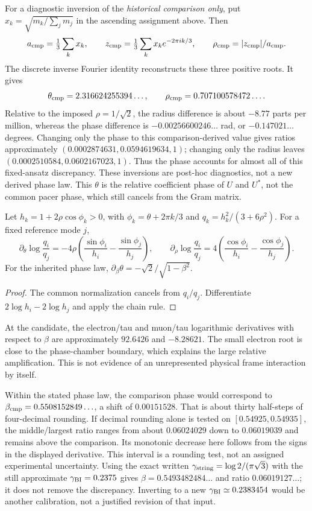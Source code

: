 For a diagnostic inversion of the \emph{historical comparison only},
put $x_k=\sqrt{m_k/\sum_jm_j}$ in the ascending assignment above.
Then
\[
 a_{\rm cmp}=\tfrac13\sum_kx_k,\qquad
 z_{\rm cmp}=\tfrac13\sum_kx_k e^{-2\pi i k/3},\qquad
 \rho_{\rm cmp}=|z_{\rm cmp}|/a_{\rm cmp}.
\]
The discrete inverse Fourier identity reconstructs these three positive
roots. It gives
\[
 \theta_{\rm cmp}=2.316624255394\ldots,\qquad
 \rho_{\rm cmp}=0.707100578472\ldots.
\]
Relative to the imposed $\rho=1/\sqrt2$, the radius difference is
about $-8.77$ parts per million, whereas the phase difference is
$-0.00256600246\ldots$ rad, or $-0.147021\ldots$ degrees.
Changing only the phase to this comparison-derived value gives
ratios approximately $(0.0002874631,0.0594619634,1)$; changing
only the radius leaves $(0.0002510584,0.0602167023,1)$.
Thus the phase accounts for almost all of this fixed-ansatz discrepancy.
These inversions are post-hoc diagnostics, not a new derived phase law.
This $\theta$ is the relative coefficient phase of $U$ and $U^*$,
not the common pacer phase, which still cancels from the Gram matrix.

\begin{proposition}
\label{v480:matrix-phase-sensitivity}
Let $h_k=1+2\rho\cos\phi_k>0$, with
$\phi_k=\theta+2\pi k/3$ and
$q_k=h_k^2/(3+6\rho^2)$. For a fixed reference mode $j$,
\[
 \partial_\theta\log\frac{q_i}{q_j}
 =-4\rho\left(\frac{\sin\phi_i}{h_i}
                    -\frac{\sin\phi_j}{h_j}\right),
 \qquad
 \partial_\rho\log\frac{q_i}{q_j}
 =4\left(\frac{\cos\phi_i}{h_i}
                    -\frac{\cos\phi_j}{h_j}\right).
\]
For the inherited phase law,
$\partial_\beta\theta=-\sqrt2/\sqrt{1-\beta^2}$.
\end{proposition}
\begin{proof}
The common normalization cancels from $q_i/q_j$.
Differentiate $2\log h_i-2\log h_j$ and apply the chain rule.
\end{proof}

At the candidate, the electron/tau and muon/tau logarithmic derivatives
with respect to $\beta$ are approximately $92.6426$ and $-8.28621$.
The small electron root is close to the phase-chamber boundary, which
explains the large relative amplification. This is not evidence of an
unrepresented physical frame interaction by itself.

Within the stated phase law, the comparison phase would correspond to
$\beta_{\rm cmp}=0.5508152849\ldots$, a shift of $0.00151528$.
That is about thirty half-steps of four-decimal rounding. If decimal
rounding alone is tested on $[0.54925,0.54935]$, the middle/largest
ratio ranges from about $0.06024029$ down to $0.06019039$ and remains
above the comparison. Its monotonic decrease here follows from the
signs in the displayed derivative. This interval is a rounding test,
not an assigned experimental uncertainty.
Using the exact written $\gamma_{\rm string}=\log2/(\pi\sqrt3)$
with the still approximate $\gamma_{\rm BI}=0.2375$ gives
$\beta=0.5493482484\ldots$ and ratio $0.06019127\ldots$;
it does not remove the discrepancy. Inverting to a new
$\gamma_{\rm BI}\simeq0.2383454$ would be another calibration,
not a justified revision of that input.


